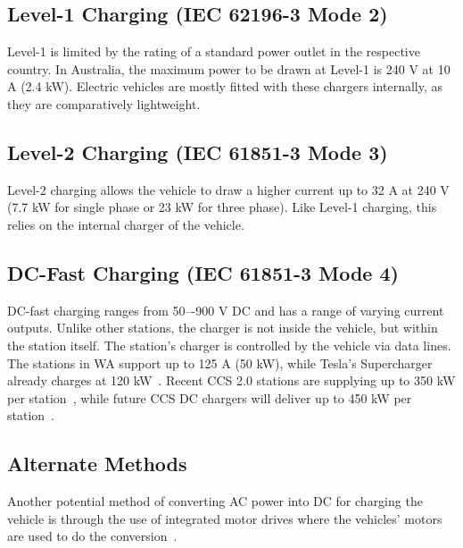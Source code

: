 \subsection{Level-1 Charging (IEC 62196-3 Mode 2)}
Level-1 is limited by the rating of a standard power outlet in the respective country. In Australia, the maximum power to be drawn at Level-1 is 240 V at 10 A (2.4 kW). Electric vehicles are mostly fitted with these chargers internally, as they are comparatively lightweight.

\subsection{Level-2 Charging (IEC 61851-3 Mode 3)}
Level-2 charging allows the vehicle to draw a higher current up to 32 A at 240 V (7.7 kW for single phase or 23 kW for three phase). Like Level-1 charging, this relies on the internal charger of the vehicle.

\subsection{DC-Fast Charging (IEC 61851-3 Mode 4)}
DC-fast charging ranges from 50–-900 V DC and has a range of varying current outputs. Unlike other stations, the charger is not inside the vehicle, but within the station itself. The station’s charger is controlled by the vehicle via data lines. The stations in WA support up to 125 A (50 kW), while Tesla's Supercharger already charges at 120 kW~\cite{tesla_supercharger_nodate}. Recent CCS 2.0 stations are supplying up to 350 kW per station~\cite{charging_interface_initiative_e._v._ccs_2018}, while future CCS DC chargers will deliver up to 450 kW per station~\cite{lambert_bmw_2017, kane_fastcharge_2017}.

\subsection{Alternate Methods}
Another potential method of converting AC power into DC for charging the vehicle is through the use of integrated motor drives where the vehicles’ motors are used to do the conversion~\cite{johansen_fast-charging_2013}. 

